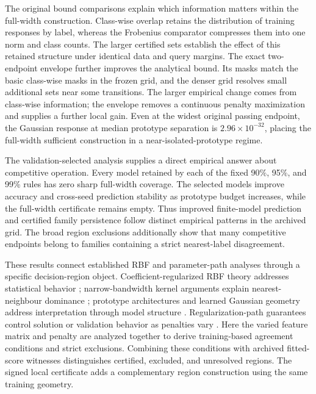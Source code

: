 \documentclass[preprint,12pt,authoryear]{elsarticle}
\begin{document}
The original bound comparisons explain which information matters within the full-width construction. Class-wise overlap retains the distribution of training responses by label, whereas the Frobenius comparator compresses them into one norm and class counts. The larger certified sets establish the effect of this retained structure under identical data and query margins. The exact two-endpoint envelope further improves the analytical bound. Its masks match the basic class-wise masks in the frozen grid, and the denser grid resolves small additional sets near some transitions. The larger empirical change comes from class-wise information; the envelope removes a continuous penalty maximization and supplies a further local gain. Even at the widest original passing endpoint, the Gaussian response at median prototype separation is $2.96\times10^{-32}$, placing the full-width sufficient construction in a near-isolated-prototype regime.

The validation-selected analysis supplies a direct empirical answer about competitive operation. Every model retained by each of the fixed 90\%, 95\%, and 99\% rules has zero sharp full-width coverage. The selected models improve accuracy and cross-seed prediction stability as prototype budget increases, while the full-width certificate remains empty. Thus improved finite-model prediction and certified family persistence follow distinct empirical patterns in the archived grid. The broad region exclusions additionally show that many competitive endpoints belong to families containing a strict nearest-label disagreement.

These results connect established RBF and parameter-path analyses through a specific decision-region object. Coefficient-regularized RBF theory addresses statistical behavior \citep{que2016}; narrow-bandwidth kernel arguments explain nearest-neighbour dominance \citep{radhakrishnan2023}; prototype architectures and learned Gaussian geometry address interpretation through model structure \citep{saralajew2025,dagostino2024}. Regularization-path guarantees control solution or validation behavior as penalties vary \citep{shibagaki2015,ndiaye2019}. Here the varied feature matrix and penalty are analyzed together to derive training-based agreement conditions and strict exclusions. Combining these conditions with archived fitted-score witnesses distinguishes certified, excluded, and unresolved regions. The signed local certificate adds a complementary region construction using the same training geometry.
\end{document}
